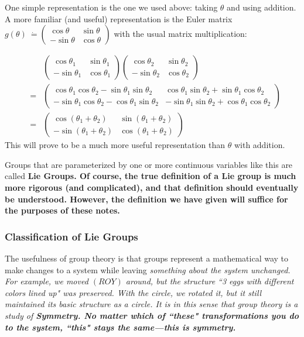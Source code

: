 \documentclass[12pt,epsf]{article}
\begin{document}
One simple representation is the one we used above: taking
$\theta$ and using addition.  A more familiar (and useful)
representation is the Euler matrix $g(\theta)~\dot{=} 
\begin{pmatrix}
\cos\theta & \sin \theta \\ -\sin \theta & \cos \theta
\end{pmatrix}$ with the usual matrix multiplication: 

\begin{eqnarray}
& & \begin{pmatrix}
\cos \theta_1 & \sin \theta_1 \\ -\sin \theta_1 & \cos \theta_1
\end{pmatrix}
\begin{pmatrix}
\cos \theta_2 & \sin \theta_2 \\ -\sin \theta_2 & \cos \theta_2
\end{pmatrix} \\
&=& 
\begin{pmatrix}
\cos\theta_1 \cos\theta_2-\sin\theta_1 \sin\theta_2 &
\cos\theta_1 \sin\theta_2+\sin\theta_1 \cos\theta_2 \\
-\sin\theta_1 \cos\theta_2-\cos\theta_1 \sin\theta_2 &
-\sin\theta_1 \sin\theta_2+\cos\theta_1 \cos\theta_2 
\end{pmatrix} \\
&=&
\begin{pmatrix}
\cos(\theta_1+\theta_2) & \sin(\theta_1+\theta_2) \\
-\sin(\theta_1+\theta_2) & \cos(\theta_1+\theta_2)
\end{pmatrix}
\end{eqnarray}
This will prove to be a much more useful representation than $\theta$
with addition.	

Groups that are parameterized by one or more continuous variables like
this are called \bf Lie Groups\rm.  Of course, the true definition of a
Lie group is much more rigorous (and complicated), and that definition
should eventually be understood.  However, the definition we have given
will suffice for the purposes of these notes.  

\subsubsection{Classification of Lie Groups}
\label{sec:lieclass}

The usefulness of group theory is that groups represent a mathematical
way to make changes to a system while leaving \it something \rm about
the system unchanged.  For example, we moved $(ROY)$ around, but the
structure ``3 eggs with different colors lined up" was preserved.  With
the circle, we rotated it, but it still maintained its basic structure
as a circle.  It is in this sense that group theory is a study of \bf
Symmetry\rm.  No matter which of ``these" transformations you do to the
system, ``this" stays the same---this is symmetry.  
\end{document}
